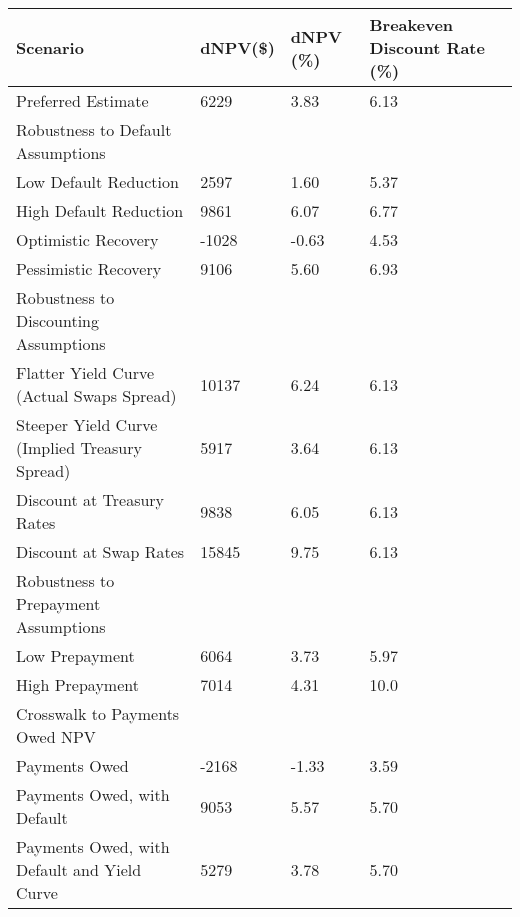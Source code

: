 
	\centering
	\begin{tabular}{>{\quad}l p{2cm} p{2cm} p{2.2cm}}
		\toprule
		\toprule
		Scenario & dNPV(\$) & dNPV (\%) & Breakeven Discount Rate (\%)\\ 
		\midrule	
		
		\vspace{1.5mm}
		\hspace{-1.2em}Preferred Estimate & 6229 & 3.83 & 6.13 \\
		
		
		\hspace{-1.2em}Robustness to Default Assumptions \\
		Low Default Reduction & 2597 & 1.60 & 5.37  \\ 
		High Default Reduction & 9861 & 6.07 & 6.77  \\ 
		Optimistic Recovery & -1028 & -0.63 & 4.53   \\ 
		Pessimistic Recovery & 9106 & 5.60 & 6.93 \\ 
		
		\hspace{-1.2em}Robustness to Discounting Assumptions \\
		Flatter Yield Curve (Actual Swaps Spread) & 10137 & 6.24  & 6.13 \\ 
		Steeper Yield Curve (Implied Treasury Spread) & 5917 & 3.64 & 6.13  \\ 
		Discount at Treasury Rates & 9838 & 6.05  & 6.13 \\ 
		Discount at Swap Rates & 15845 & 9.75 & 6.13 \\ 
		
		\hspace{-1.2em}Robustness to Prepayment Assumptions \\
		Low Prepayment & 6064 & 3.73  & 5.97 \\ 
		High Prepayment & 7014 & 4.31 & 10.0 \\ 
		
		\hspace{-1.2em}Crosswalk to Payments Owed NPV \\
		Payments Owed & -2168 & -1.33 & 3.59   \\ 
		Payments Owed, with Default & 9053 & 5.57 & 5.70  \\ 
		Payments Owed, with Default and Yield Curve & 5279 & 3.78 & 5.70 \\ 
		\bottomrule
		\bottomrule
	\end{tabular}

